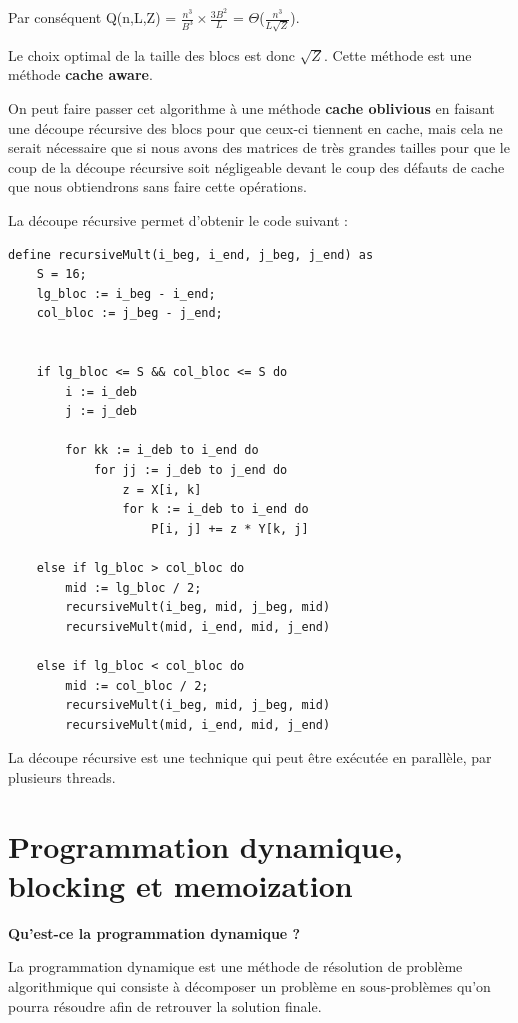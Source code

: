 \documentclass[a4paper]{article}
\begin{document}
Par conséquent Q(n,L,Z) = \(\frac{n^3}{B^3} \times \frac{3B^2}{L}\) = \(\Theta\)(\(\frac{n^3}{L\sqrt{Z}}\)).

Le choix optimal de la taille des blocs est donc \(\sqrt{Z}\).
Cette méthode est une méthode \textbf{cache aware}.

On peut faire passer cet algorithme à une méthode \textbf{cache oblivious} en faisant une découpe récursive des blocs pour que ceux-ci tiennent en cache, mais cela ne serait nécessaire que si nous avons des matrices de très grandes tailles pour que le coup de la découpe récursive soit négligeable devant le coup des défauts de cache que nous obtiendrons sans faire cette opérations.

La découpe récursive permet d'obtenir le code suivant :

\begin{verbatim}
define recursiveMult(i_beg, i_end, j_beg, j_end) as
    S = 16;
    lg_bloc := i_beg - i_end;
    col_bloc := j_beg - j_end;


    if lg_bloc <= S && col_bloc <= S do
        i := i_deb
        j := j_deb

        for kk := i_deb to i_end do
            for jj := j_deb to j_end do
                z = X[i, k]
                for k := i_deb to i_end do
                    P[i, j] += z * Y[k, j]

    else if lg_bloc > col_bloc do
        mid := lg_bloc / 2;
        recursiveMult(i_beg, mid, j_beg, mid)
        recursiveMult(mid, i_end, mid, j_end)

    else if lg_bloc < col_bloc do
        mid := col_bloc / 2;
        recursiveMult(i_beg, mid, j_beg, mid)
        recursiveMult(mid, i_end, mid, j_end)

\end{verbatim}


La découpe récursive est une technique qui peut être exécutée en parallèle, par plusieurs threads.


\section{Programmation dynamique, blocking et memoization}
\label{sec:orge4015df}

\textbf{Qu'est-ce la programmation dynamique ?}

La programmation dynamique est une méthode de résolution de problème algorithmique qui consiste à décomposer un problème en sous-problèmes qu'on pourra résoudre afin de retrouver la solution finale.
\end{document}
